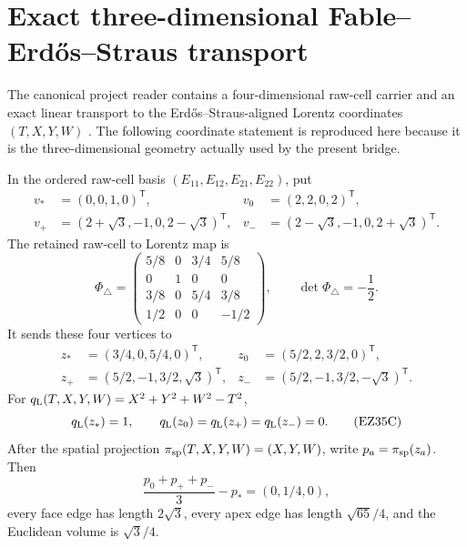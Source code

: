 \section{Exact three-dimensional Fable--Erd\H{o}s--Straus transport}
\label{sec:fable-es-tetrahedron}

The canonical project reader contains a four-dimensional raw-cell carrier and
an exact linear transport to the Erd\H{o}s--Straus-aligned Lorentz coordinates
\((T,X,Y,W)\) \cite[Theorem on the exact spatial quarter altitude of the
transported raw-cell tetrahedron]{ESReader}.  The following coordinate
statement is reproduced here because it is the three-dimensional geometry
actually used by the present bridge.

\begin{theorem}
\label{thm:transported-raw-tetrahedron}
In the ordered raw-cell basis
\((E_{11},E_{12},E_{21},E_{22})\), put
\[
\begin{aligned}
 v_\ast&=(0,0,1,0)^{\mathsf T},&
 v_0&=(2,2,0,2)^{\mathsf T},\\
 v_+&=(2+\sqrt3,-1,0,2-\sqrt3)^{\mathsf T},&
 v_-&=(2-\sqrt3,-1,0,2+\sqrt3)^{\mathsf T}.
\end{aligned}
\]
The retained raw-cell to Lorentz map is
\begin{equation}
 \Phi_\triangle=
 \begin{pmatrix}
  5/8&0&3/4&5/8\\
  0&1&0&0\\
  3/8&0&5/4&3/8\\
  1/2&0&0&-1/2
 \end{pmatrix},
 \qquad \det\Phi_\triangle=-\frac12.                   \tag{EZ35A}
\end{equation}
It sends these four vertices to
\begin{align}
 z_\ast&=(3/4,0,5/4,0)^{\mathsf T},&
 z_0&=(5/2,2,3/2,0)^{\mathsf T},\nonumber\\
 z_+&=(5/2,-1,3/2,\sqrt3)^{\mathsf T},&
 z_-&=(5/2,-1,3/2,-\sqrt3)^{\mathsf T}.              \tag{EZ35B}
\end{align}
For \(q_{\rm L}(T,X,Y,W)=X^2+Y^2+W^2-T^2\),
\[
 q_{\rm L}(z_\ast)=1,\qquad
 q_{\rm L}(z_0)=q_{\rm L}(z_+)=q_{\rm L}(z_-)=0.       \tag{EZ35C}
\]
After the spatial projection
\(\pi_{\rm sp}(T,X,Y,W)=(X,Y,W)\), write
\(p_a=\pi_{\rm sp}(z_a)\).  Then
\begin{equation}
 \frac{p_0+p_++p_-}{3}-p_\ast=(0,1/4,0),               \tag{EZ35D}
\end{equation}
every face edge has length \(2\sqrt3\), every apex edge has length
\(\sqrt{65}/4\), and the Euclidean volume is \(\sqrt3/4\).
\end{theorem}

